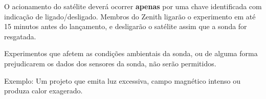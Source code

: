     \begin{definition}[7]
    O acionamento do satélite deverá ocorrer \textbf{apenas} por uma chave identificada com indicação de ligado/desligado. Membros do Zenith ligarão o experimento em até 15 minutos antes do lançamento, e desligarão o satélite assim que a sonda for resgatada.
    \end{definition}

    \begin{definition}[8]
    Experimentos que afetem as condições ambientais da sonda, ou de alguma forma prejudicarem os dados dos sensores da sonda, não serão permitidos.
    
    Exemplo: Um projeto que emita luz excessiva, campo magnético intenso ou produza calor exagerado.
    \end{definition}